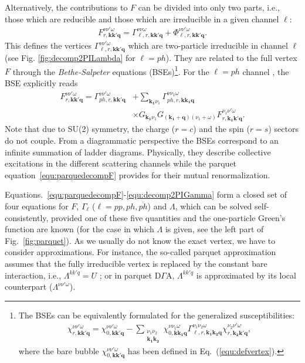 \documentclass[rmp,aps,reprint,amsmath,amssymb,superscriptaddress,showpacs,nofootinbib]{revtex4-1}
\begin{document}
Alternatively, the contributions to $F$ can be divided into only two parts, i.e., those which are reducible and those which are irreducible in a given channel $\ell$:
\begin{align}
\label{equ:decompF}
F_{r,\mathbf{k}\mathbf{k}'\mathbf{q}}^{\nu\nu'\omega} = \Gamma_{\ell,r,\mathbf{k}\mathbf{k}'\mathbf{q}}^{\nu\nu\omega} + \Phi_{\ell,r,\mathbf{k}\mathbf{k}'\mathbf{q}}^{\nu\nu'\omega}.
\end{align}
This defines the vertices $\Gamma_{\ell,r,\mathbf{k}\mathbf{k'}\mathbf{q}}^{\nu\nu'\omega}$ which are two-particle irreducible in channel $\ell$ (see Fig. \ref{fig:decomp2PILambda} for $\ell=ph$). They are related to the full vertex $F$ through the {\sl Bethe-Salpeter} equations (BSEs)\footnote{The BSEs can be equivalently formulated for the generalized susceptibilities:
\begin{align*} 
 \chi_{r,\mathbf{k}\mathbf{k'}\mathbf{q}}^{\nu\nu'\omega}=\chi_{0,\mathbf{k}\mathbf{k'}\mathbf{q}}^{\nu\nu'\omega}-\sum_{\substack{\nu_1\nu_2\\\mathbf{k_1}\mathbf{k_2}}}\chi_{0,\mathbf{k}\mathbf{k_1}\mathbf{q}}^{\nu\nu_1\omega}\Gamma_{\ell,r,\mathbf{k_1}\mathbf{k_2}\mathbf{q}}^{\nu_1\nu_2\omega}\chi_{r,\mathbf{k_2}\mathbf{k'}\mathbf{q}}^{\nu_2\nu'\omega},
\end{align*}
where the bare bubble $\chi_{0,\mathbf{k}\mathbf{k'}\mathbf{q}}^{\nu\nu'\omega}$ has been defined in Eq.~(\ref{equ:defvertex}).}. For the $\ell=ph$ channel \cite{Bickers1991,Bickers2004}, the BSE explicitly reads
\begin{align} 
 \label{equ:decomp2PIGamma} 
  F_{r,\mathbf{k}\mathbf{k'}\mathbf{q}}^{\nu\nu'\omega}=\Gamma_{ph,r,\mathbf{k}\mathbf{k'}\mathbf{q}}^{\nu\nu'\omega}&+\sum_{\mathbf{k_1}\nu_1}\Gamma_{ph,r,\mathbf{k}\mathbf{k_1}\mathbf{q}}^{\nu\nu_1\omega}\\&\times G_{\mathbf{k_1}\nu_1}G_{(\mathbf{k_1}+\mathbf{q})(\nu_1+\omega)}F_{r,\mathbf{k_1}\mathbf{k'}\mathbf{q}}^{\nu_1\nu'\omega}.\nonumber
\end{align}
Note that due to SU(2) symmetry, the charge ($r\!=\!c$) and the spin ($r\!=\!s$) sectors do not couple. From a diagrammatic perspective the BSEs correspond to an infinite summation of ladder diagrams. Physically, they describe collective excitations in the different scattering channels  while the parquet equation~\eqref{equ:parquedecompF} provides for their mutual renormalization.

Equations.~\eqref{equ:parquedecompF}-\eqref{equ:decomp2PIGamma} form a closed set of four equations for $F$, $\Gamma_\ell$ ($\ell=pp,ph,\overline{ph}$) and $\Lambda$, which can be solved self-consistently, provided one of these five quantities and the one-particle Green's function are known (for the case in which $\Lambda$ is given, see the left part of Fig.~\ref{fig:parquet}). As we usually do not know the exact vertex, we have to consider approximations. For instance, the so-called parquet approximation assumes that the fully irreducible vertex is replaced by the constant bare interaction, i.e., $\Lambda^{kk'q}=U$ \cite{Bickers2004}; or in parquet D$\Gamma$A, $\Lambda^{kk'q}$ is approximated by its local counterpart ($\Lambda^{\nu\nu'\omega}$). 
\end{document}
